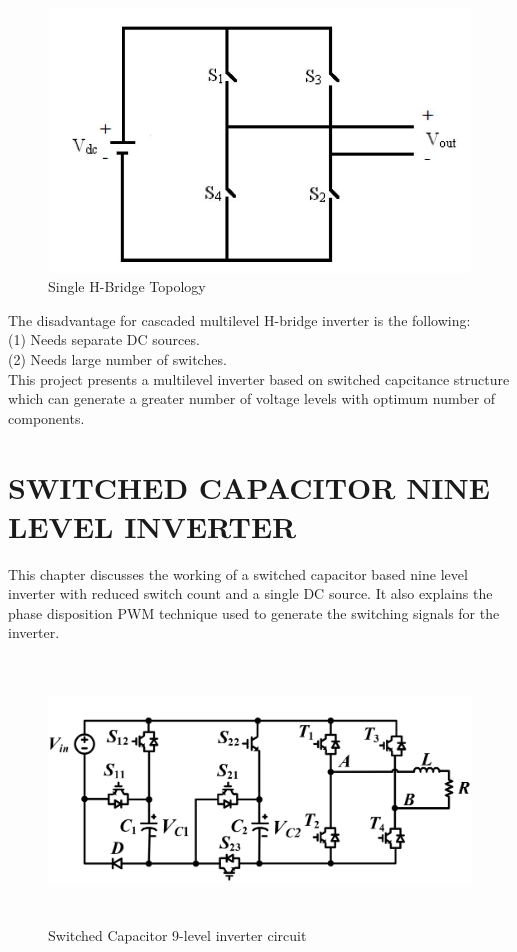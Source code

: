 \documentclass[12pt,a4paper]{report}
\begin{document}
\begin{figure}[h!]\centering
	\includegraphics[width=12cm,height=7cm]{figures/hbridge.jpg}
	\caption{Single H-Bridge Topology}\label{hbridge}
\end{figure}

The disadvantage for cascaded multilevel H-bridge inverter is the
following:\\
(1) Needs separate DC sources.\\
(2) Needs large number of switches. \\

This project presents a multilevel inverter based on switched capcitance structure which can generate a greater number of voltage levels with optimum number of components.\\
\cleardoublepage

\chapter{SWITCHED CAPACITOR NINE LEVEL INVERTER}

This chapter discusses the working of a switched capacitor based nine level inverter with reduced switch count and a single DC source. It also explains the phase disposition PWM technique used to generate the switching signals for the inverter.

 \begin{figure}[h!]
 	\begin{center}
 		\includegraphics[width=16cm,height=7cm]{figures/Main_Circuit}
 	\end{center}
 	\caption{Switched Capacitor 9-level inverter circuit}
 	\label{sc}
 	
 \end{figure}
 
\end{document}

